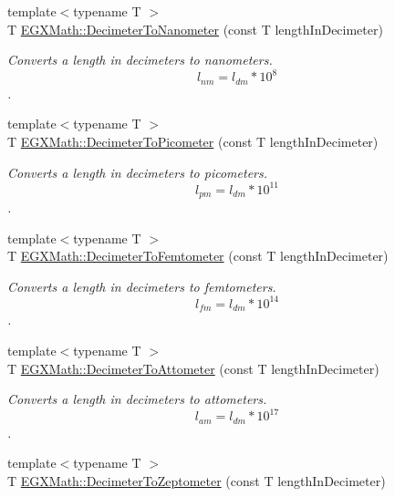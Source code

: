 \begin{DoxyCompactItemize}
{\footnotesize template$<$typename T $>$ }\\T \mbox{\hyperlink{group___e_g_x_math-_conversions-_length_conversions-_s_i-_decimeter-_s_i_ga5bf2905937fea582ee35031d9017807f}{E\+G\+X\+Math\+::\+Decimeter\+To\+Nanometer}} (const T length\+In\+Decimeter)
\begin{DoxyCompactList}\small\item\em Converts a length in decimeters to nanometers. \[ l_{nm}=l_{dm} * 10^{8} \]. \end{DoxyCompactList}\item 
{\footnotesize template$<$typename T $>$ }\\T \mbox{\hyperlink{group___e_g_x_math-_conversions-_length_conversions-_s_i-_decimeter-_s_i_gaac5fa4b7b538abe2d19f33e131e9bbde}{E\+G\+X\+Math\+::\+Decimeter\+To\+Picometer}} (const T length\+In\+Decimeter)
\begin{DoxyCompactList}\small\item\em Converts a length in decimeters to picometers. \[ l_{pm}=l_{dm} * 10^{11} \]. \end{DoxyCompactList}\item 
{\footnotesize template$<$typename T $>$ }\\T \mbox{\hyperlink{group___e_g_x_math-_conversions-_length_conversions-_s_i-_decimeter-_s_i_gab06170fbc8b349582e4ae34d41f3f706}{E\+G\+X\+Math\+::\+Decimeter\+To\+Femtometer}} (const T length\+In\+Decimeter)
\begin{DoxyCompactList}\small\item\em Converts a length in decimeters to femtometers. \[ l_{fm}=l_{dm} * 10^{14} \]. \end{DoxyCompactList}\item 
{\footnotesize template$<$typename T $>$ }\\T \mbox{\hyperlink{group___e_g_x_math-_conversions-_length_conversions-_s_i-_decimeter-_s_i_ga9b13c4c4f05e01a1e28293b26b69e01a}{E\+G\+X\+Math\+::\+Decimeter\+To\+Attometer}} (const T length\+In\+Decimeter)
\begin{DoxyCompactList}\small\item\em Converts a length in decimeters to attometers. \[ l_{am}=l_{dm} * 10^{17} \]. \end{DoxyCompactList}\item 
{\footnotesize template$<$typename T $>$ }\\T \mbox{\hyperlink{group___e_g_x_math-_conversions-_length_conversions-_s_i-_decimeter-_s_i_ga5462e9c56431f0cf1daeafb729eeed24}{E\+G\+X\+Math\+::\+Decimeter\+To\+Zeptometer}} (const T length\+In\+Decimeter)

\end{DoxyCompactItemize}

